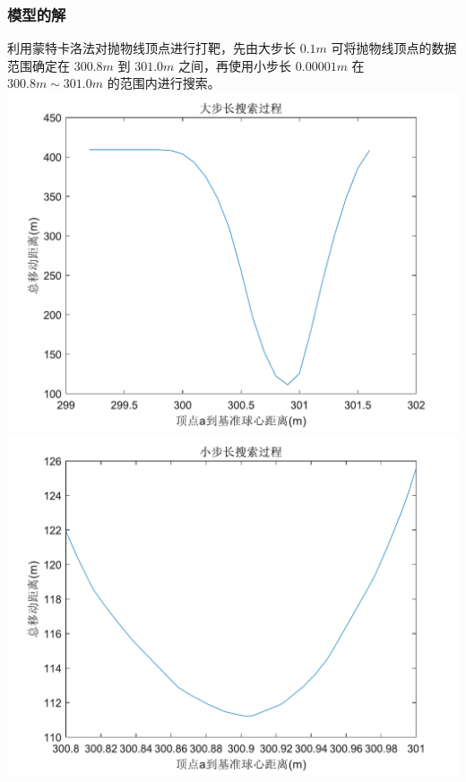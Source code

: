 \documentclass[withoutpreface,bwprint]{cumcmthesis} %
\begin{document}
\subsubsection{模型的解}
利用蒙特卡洛法对抛物线顶点进行打靶，先由大步长 $0.1m$ 可将抛物线顶点的数据范围确定在 $300.8m$
到 $301.0m$ 之间，再使用小步长 $0.00001m$ 在 $300.8m \sim 301.0m$ 的范围内进行搜索。\\
    {\centering
    \includegraphics[scale=0.8]{大步长搜索过程.pdf}}
\\
    {\centering
    \includegraphics[scale=0.8]{小步长搜索过程.pdf}}
\\
\end{document}
